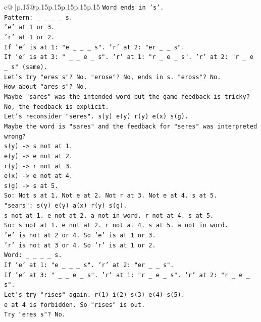 \documentclass{article}
\begin{document}
{\begin{supertabular}{c@{$\;$}|p{.15\linewidth}@{}p{.15\linewidth}p{.15\linewidth}p{.15\linewidth}p{.15\linewidth}p{.15\linewidth}}
{{{\texttt{Word ends in 's'.} \\
\texttt{Pattern: \_ \_ \_ \_ s.} \\
\texttt{'e' at 1 or 3.} \\
\texttt{'r' at 1 or 2.} \\
\texttt{If 'e' is at 1: "e \_ \_ \_ s". 'r' at 2: "er \_ \_ s".} \\
\texttt{If 'e' is at 3: " \_ \_ e \_ s". 'r' at 1: "r \_ e \_ s". 'r' at 2: "r \_ e \_ s" (same).} \\
\texttt{Let's try "eres s"? No. "erose"? No, ends in s. "eross"? No.} \\
\texttt{How about "ares s"? No.} \\
\texttt{Maybe "sares" was the intended word but the game feedback is tricky? No, the feedback is explicit.} \\
\texttt{Let's reconsider "seres". s(y) e(y) r(y) e(x) s(g).} \\
\texttt{Maybe the word is "sares" and the feedback for "seres" was interpreted wrong?} \\
\texttt{s(y) {-}> s not at 1.} \\
\texttt{e(y) {-}> e not at 2.} \\
\texttt{r(y) {-}> r not at 3.} \\
\texttt{e(x) {-}> e not at 4.} \\
\texttt{s(g) {-}> s at 5.} \\
\texttt{So: Not s at 1. Not e at 2. Not r at 3. Not e at 4. s at 5.} \\
\texttt{"sears": s(y) e(y) a(x) r(y) s(g).} \\
\texttt{s not at 1. e not at 2. a not in word. r not at 4. s at 5.} \\
\texttt{So: s not at 1. e not at 2. r not at 4. s at 5. a not in word.} \\
\texttt{'e' is not at 2 or 4. So 'e' is at 1 or 3.} \\
\texttt{'r' is not at 3 or 4. So 'r' is at 1 or 2.} \\
\texttt{Word: \_ \_ \_ \_ s.} \\
\texttt{If 'e' at 1: "e \_ \_ \_ s". 'r' at 2: "er \_ \_ s".} \\
\texttt{If 'e' at 3: " \_ \_ e \_ s". 'r' at 1: "r \_ e \_ s". 'r' at 2: "r \_ e \_ s".} \\
\texttt{Let's try "rises" again. r(1) i(2) s(3) e(4) s(5).} \\
\texttt{e at 4 is forbidden. So "rises" is out.} \\
\texttt{Try "eres s"? No.} \\
}}}
\end{supertabular}}
\end{document}
